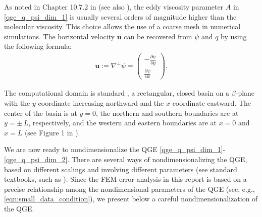 As noted in Chapter 10.7.2 in \cite{Vallis06} (see also \cite{San12}), the eddy viscosity parameter
$A$ in \eqref{qge_q_psi_dim_1} is usually several orders of magnitude higher than the molecular
viscosity. This choice allows the use of a coarse mesh in numerical simulations. The horizontal
velocity $\mathbf{u}$ can be recovered from $\psi$ and $q$ by using the following formula:
\begin{align}
  \mathbf{u} := \nabla^{\perp} \psi = 
    \begin{pmatrix} - \frac{\partial \psi}{\partial y} \\
    \frac{\partial \psi}{\partial x}
  \end{pmatrix} .
\label{eqn:u_psi}
\end{align}

The computational domain is standard \cite{Greatbatch00}, a rectangular, closed basin on a
$\beta$-plane with the $y$ coordinate increasing northward and the $x$ coordinate eastward. The
center of the basin is at $y=0$, the northern and southern boundaries are at $y = \pm \, L$,
respectively, and the western and eastern boundaries are at $x = 0$ and $x = L$ (see Figure 1 in
\cite{Greatbatch00}).

We are now ready to nondimensionalize the QGE \eqref{qge_q_psi_dim_1}-\eqref{qge_q_psi_dim_2}.
There are several ways of nondimensionalizing the QGE, based on different scalings and involving
different parameters (see standard textbooks, such as \cite{Cushman11,Majda,Pedlosky92,Vallis06}).
Since the FEM error analysis in this report is based on a precise relationship among the
nondimensional parameters of the QGE (see, e.g., \eqref{eqn:small_data_condition}), we present below
a careful nondimensionalization of the QGE.

